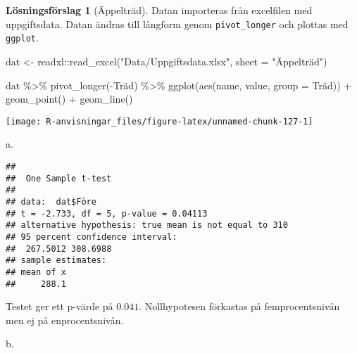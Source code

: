 \documentclass[
]{book}
\newenvironment{Shaded}{\begin{snugshade}}{\end{snugshade}}
\newcommand{\AttributeTok}[1]{\textcolor[rgb]{0.77,0.63,0.00}{#1}}
\newcommand{\DecValTok}[1]{\textcolor[rgb]{0.00,0.00,0.81}{#1}}
\newcommand{\FunctionTok}[1]{\textcolor[rgb]{0.00,0.00,0.00}{#1}}
\newcommand{\NormalTok}[1]{#1}
\newcommand{\OtherTok}[1]{\textcolor[rgb]{0.56,0.35,0.01}{#1}}
\newcommand{\SpecialCharTok}[1]{\textcolor[rgb]{0.00,0.00,0.00}{#1}}
\newcommand{\StringTok}[1]{\textcolor[rgb]{0.31,0.60,0.02}{#1}}
\theoremstyle{definition}
\theoremstyle{definition}
\theoremstyle{definition}
\theoremstyle{definition}
\newtheorem{hypothesis}{Lösningsförslag}[chapter]
\theoremstyle{remark}
\begin{document}
\begin{hypothesis}[Äppelträd]
Datan importeras från excelfilen med uppgiftsdata. Datan ändras till långform genom \texttt{pivot\_longer} och plottas med \texttt{ggplot}.

\begin{Shaded}
\begin{Highlighting}[]
\NormalTok{dat }\OtherTok{\textless{}{-}}\NormalTok{ readxl}\SpecialCharTok{::}\FunctionTok{read\_excel}\NormalTok{(}\StringTok{"Data/Uppgiftsdata.xlsx"}\NormalTok{, }\AttributeTok{sheet =} \StringTok{"Äppelträd"}\NormalTok{)}

\NormalTok{dat }\SpecialCharTok{\%\textgreater{}\%} 
  \FunctionTok{pivot\_longer}\NormalTok{(}\SpecialCharTok{{-}}\NormalTok{Träd) }\SpecialCharTok{\%\textgreater{}\%} 
  \FunctionTok{ggplot}\NormalTok{(}\FunctionTok{aes}\NormalTok{(name, value, }\AttributeTok{group =}\NormalTok{ Träd)) }\SpecialCharTok{+}
  \FunctionTok{geom\_point}\NormalTok{() }\SpecialCharTok{+}
  \FunctionTok{geom\_line}\NormalTok{()}
\end{Highlighting}
\end{Shaded}

\begin{center}\texttt{[image: R-anvisningar\_files/figure-latex/unnamed-chunk-127-1]} \end{center}

a.

\begin{Shaded}
\end{Shaded}

\begin{verbatim}
## 
##  One Sample t-test
## 
## data:  dat$Före
## t = -2.733, df = 5, p-value = 0.04113
## alternative hypothesis: true mean is not equal to 310
## 95 percent confidence interval:
##  267.5012 308.6988
## sample estimates:
## mean of x 
##     288.1
\end{verbatim}

Testet ger ett p-värde på \(0.041\). Nollhypotesen förkastas på femprocentsnivån men ej på enprocentsnivån.

b.

\begin{Shaded}
\end{Shaded}


\end{hypothesis}
\end{document}
